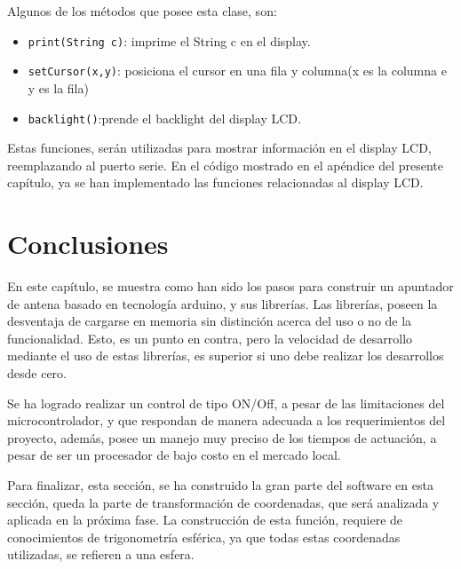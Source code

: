 Algunos de los métodos que posee esta clase, son: 
\begin{itemize}
	\item \texttt{print(String c)}: imprime el String c en el display. 
	\item \texttt{setCursor(x,y)}: posiciona el cursor en una fila y columna(x es la columna e y es la fila) 
	\item \texttt{backlight()}:prende el backlight del display LCD.   
\end{itemize}

Estas funciones, serán utilizadas para mostrar información en el display LCD, reemplazando al puerto serie. En el código mostrado en el apéndice del presente capítulo, ya se han implementado las funciones relacionadas al display LCD. 


\section{Conclusiones}


En este capítulo, se muestra como han sido los pasos para construir un apuntador de antena basado en tecnología arduino, y sus librerías. Las librerías, poseen la desventaja de cargarse en memoria sin distinción acerca del uso o no de la funcionalidad. Esto, es un punto en contra, pero la velocidad de desarrollo mediante el uso de estas librerías, es superior si uno debe realizar los desarrollos desde cero.  

Se ha logrado realizar un control de tipo ON/Off, a pesar de las limitaciones del microcontrolador, y que respondan de manera adecuada a los requerimientos del proyecto, además, posee un manejo muy preciso de los tiempos de actuación, a pesar de ser un procesador de bajo costo en el mercado local. 


Para finalizar, esta sección, se ha construido la gran parte del software en esta sección, queda la parte de transformación de coordenadas, que será analizada y aplicada en la próxima fase. La construcción de esta función, requiere de conocimientos de trigonometría esférica, ya que todas estas coordenadas utilizadas, se refieren a una esfera. 



